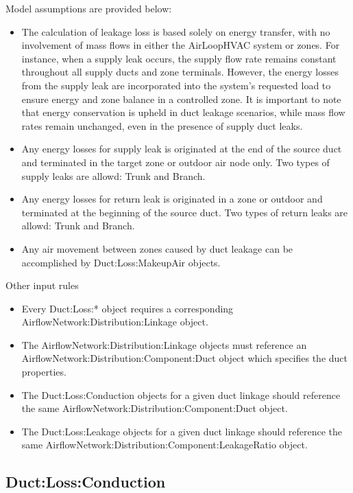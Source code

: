 Model assumptions are provided below:

\begin{itemize}
\item
  The calculation of leakage loss is based solely on energy transfer, with no involvement of mass flows in either the AirLoopHVAC system or zones. For instance, when a supply leak occurs, the supply flow rate remains constant throughout all supply ducts and zone terminals. However, the energy losses from the supply leak are incorporated into the system's requested load to ensure energy and zone balance in a controlled zone. It is important to note that energy conservation is upheld in duct leakage scenarios, while mass flow rates remain unchanged, even in the presence of supply duct leaks.
\item
  Any energy losses for supply leak is originated at the end of the source duct and terminated in the target zone or outdoor air node only. Two types of supply leaks are allowd: Trunk and Branch.
\item
  Any energy losses for return leak is originated in a zone or outdoor and terminated at the beginning of the source duct. Two types of return leaks are allowd: Trunk and Branch.
\item
  Any air movement between zones caused by duct leakage can be accomplished by Duct:Loss:MakeupAir objects.
\end{itemize}

Other input rules

\begin{itemize}
\item
Every Duct:Loss:* object requires a corresponding AirflowNetwork:Distribution:Linkage object.
\item
The AirflowNetwork:Distribution:Linkage objects must reference an AirflowNetwork:Distribution:Component:Duct object which specifies the duct properties.
\item
The Duct:Loss:Conduction objects for a given duct linkage should reference the same AirflowNetwork:Distribution:Component:Duct object.
\item
The Duct:Loss:Leakage objects for a given duct linkage should reference the same AirflowNetwork:Distribution:Component:LeakageRatio object.
\end{itemize}

\subsection{Duct:Loss:Conduction}\label{ductlossconduction}

